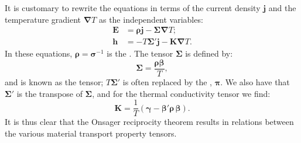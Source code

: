 It is customary to rewrite the equations in terms of the current density $\mathbf{j}$ and the temperature gradient $\bm{\nabla}T$ as the independent variables:
\begin{align}
	\mathbf{E} &= \bm{\rho}\mathbf{j} - \bm{\Sigma}\bm{\nabla} T;\\
	\mathbf{h} &= -T\bm{\Sigma}'\mathbf{j} - \bm{K}\bm{\nabla} T.
\end{align}
In these equations, $\bm{\rho} = \bm{\sigma}^{-1}$ is the . The tensor $\bm{\Sigma}$ is defined by:
\begin{equation}
	\bm{\Sigma} = \frac{\bm{\rho}\bm{\beta}}{T},
\end{equation}
and is known as the  tensor; $T\bm{\Sigma}'$ is often replaced by the , $\bm{\pi}$.  We also have that $\bm{\Sigma}'$ is the transpose of $\bm{\Sigma}$, and for the thermal conductivity tensor we find:
\begin{equation}
	\bm{K} = \frac{1}{T}\left(\bm{\gamma} - \bm{\beta}'\bm{\rho}\,\bm{\beta}\right).
\end{equation}
It is thus clear that the Onsager reciprocity theorem results in relations between the various material transport property tensors.  




